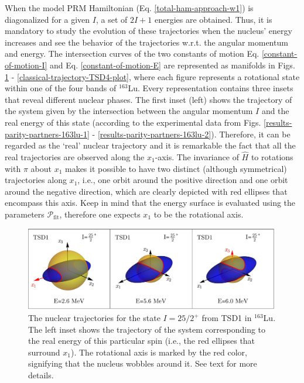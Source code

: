 When the model PRM Hamiltonian (Eq. \ref{total-ham-approach-w1}) is diagonalized for a given $I$, a set of $2I+1$ energies are obtained. Thus, it is mandatory to study the evolution of these trajectories when the nucleus' energy increases and see  the behavior of the trajectories w.r.t. the angular momentum and energy. The intersection curves of the two constants of motion Eq. \ref{constant-of-motion-I} and Eq. \ref{constant-of-motion-E} are represented as manifolds in Figs. \ref{classical-trajectory-TSD1-plot} - \ref{classical-trajectory-TSD4-plot}, where each figure represents a rotational state within one of the four bands of $^{163}$Lu. Every representation contains three insets that reveal different nuclear phases. The first inset (left) shows the trajectory of the system given by the intersection between the angular momentum $I$ and the real energy of this state (according to the experimental data from Figs. \ref{results-parity-partners-163lu-1} - \ref{results-parity-partners-163lu-2}). Therefore, it can be regarded as the `real' nuclear trajectory and it is remarkable the fact that all the real trajectories are observed along the $x_1$-axis. The invariance of $\hat{H}$ to rotations with $\pi$ about $x_1$ makes it possible to have two distinct (although symmetrical) trajectories along $x_1$, i.e., one orbit around the positive direction and one orbit around the negative direction, which are clearly depicted with red ellipses that encompass this axis. Keep in mind that the energy surface is evaluated using the parameters $\mathcal{P}_\text{fit}$, therefore one expects $x_1$ to be the rotational axis.
\begin{figure}
    \centering
    \includegraphics[width=0.99\textwidth]{Chapters/Figures/parity-partners-plots/classical-trajectory-TSD1.pdf}
    \caption{The nuclear trajectories for the state $I=25/2^+$ from TSD1 in $^{163}$Lu. The left inset shows the trajectory of the system corresponding to the real energy of this particular spin (i.e., the red ellipses that surround $x_1$). The rotational axis is marked by the red color, signifying that the nucleus wobbles around it. See text for more details.}
    \label{classical-trajectory-TSD1-plot}
\end{figure}
